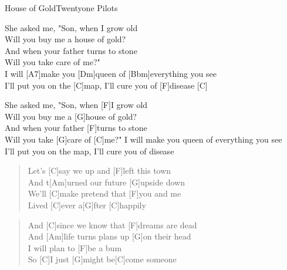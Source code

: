 \begin{song}{House of Gold}{Twentyone Pilots}

    \begin{intro}  
        [C]
    \end{intro}  

    \begin{chorus}
        [C]She asked me, "Son, when I grow old \\
        [C]Will you buy me a house of gold? \\
        [C]And when your father turns to stone \\
        [C]Will you take care of me?" \\
        [F]I will [A7]make you [Dm]queen of [Bbm]everything you see \\
        I'll put you on the [C]map, I'll cure you of [F]disease [C]
    \end{chorus}  

    \begin{chorus}
        [C]She asked me, "Son, when [F]I grow old \\
        [C]Will you buy me a [G]house of gold? \\
        [C]And when your father [F]turns to stone \\
        [C]Will you take [G]care of [C]me?"
        I will make you queen of everything you see \\
        I'll put you on the map, I'll cure you of disease 
    \end{chorus}  

    \begin{verse}  
        Let's [C]say we up and [F]left this town \\
        And t[Am]urned our future [G]upside down \\
        We'll [C]make pretend that [F]you and me \\
        Lived [C]ever a[G]fter [C]happily 
    \end{verse}  


    \begin{verse}  
        And [C]since we know that [F]dreams are dead \\
        And [Am]life turns plans up [G]on their head \\
        [C]I will plan to [F]be a bum \\
        So [C]I just [G]might be[C]come someone 
    \end{verse}  


\end{song}
